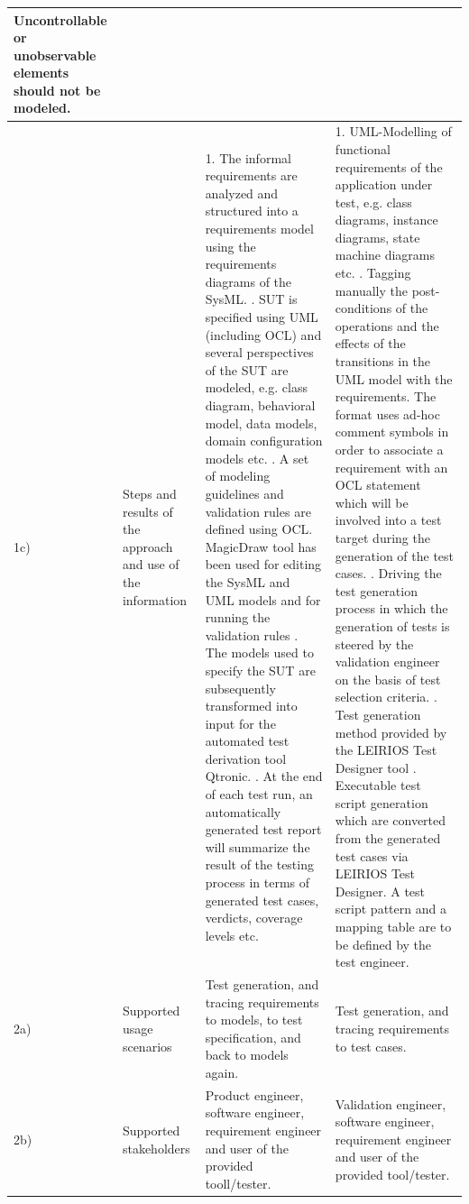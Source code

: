 \begin{landscape}
\begin{small}
\begin{longtable}{ p{0.5cm} | p{2.5cm} | p{9cm} | p{9cm} }
\newline Uncontrollable or unobservable elements should not be modeled.\\
\hline
1c) & Steps and results of the approach and use of the information & 1. The informal requirements are analyzed and structured into a requirements model using the requirements diagrams of the SysML.
\newline 2. SUT is specified using UML (including OCL) and several perspectives of the SUT are modeled, e.g. class diagram, behavioral model, data models, domain configuration models etc. 
\newline 3. A set of modeling guidelines and validation rules are defined using OCL. MagicDraw tool has been used for editing the SysML and UML models and for running the validation rules
\newline 4. The models used to specify the SUT are subsequently transformed into input for the automated test derivation tool Qtronic. 
\newline 5. At the end of each test run, an automatically generated test report will summarize the result of the testing process in terms of generated test cases, verdicts, coverage levels etc.
& 1. UML-Modelling of functional requirements of the application under test, e.g. class diagrams, instance diagrams, state machine diagrams  etc.
\newline2. Tagging manually the post-conditions of the operations and the effects of the transitions in the UML model with the requirements. The format uses ad-hoc comment symbols in order to associate a requirement with an OCL statement which will be involved into a test target during the generation of the test cases.
\newline3. Driving the test generation process in which the generation of tests is steered by the validation engineer on the basis of test selection criteria.
\newline4. Test generation method provided by the LEIRIOS Test Designer tool
\newline5. Executable test script generation which are converted from the generated test cases via LEIRIOS Test Designer. A test script pattern and a mapping table are to be defined by the test engineer.\\
\hline
2a) & Supported usage scenarios& Test generation, and tracing requirements to models, to test specification, and back to models again.& Test generation, and tracing requirements to test cases. \\
\hline
2b) & Supported stakeholders & Product engineer, software engineer, requirement engineer and user of the provided tooll/tester.  & Validation engineer, software engineer, requirement engineer and user of the provided tool/tester. \\

\end{longtable}
\end{small}
\end{landscape}
